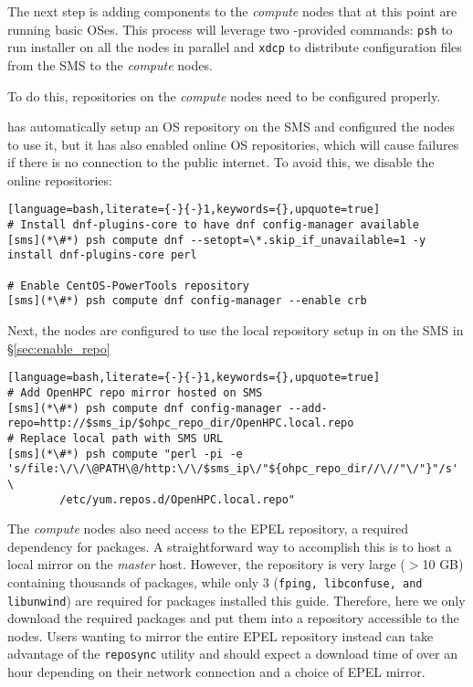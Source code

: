 
The next step is adding \OHPC{} components to the {\em compute} nodes that at this
point are running basic OSes.  This process will leverage two \xCAT{}-provided
commands: \texttt{psh} to run \texttt{\pkgmgr{}} installer on all the
nodes in parallel  and \texttt{xdcp} to distribute configuration files from the
SMS to the {\em compute} nodes. 

\noindent To do this, repositories on the {\em compute} nodes need to be configured
properly. 

\xCAT{} has automatically setup an  OS repository on the SMS and configured the
nodes to use it, but it has  also enabled online OS repositories, which will
cause  \texttt{\pkgmgr{}} failures if there is no connection to the public internet. 
To avoid this, we disable the online repositories:

\begin{lstlisting}[language=bash,literate={-}{-}1,keywords={},upquote=true]
# Install dnf-plugins-core to have dnf config-manager available
[sms](*\#*) psh compute dnf --setopt=\*.skip_if_unavailable=1 -y install dnf-plugins-core perl

# Enable CentOS-PowerTools repository
[sms](*\#*) psh compute dnf config-manager --enable crb
\end{lstlisting}

\noindent Next, the nodes are configured to use the local \OHPC{} repository
setup in on the SMS in \S\ref{sec:enable_repo}

\begin{lstlisting}[language=bash,literate={-}{-}1,keywords={},upquote=true]
# Add OpenHPC repo mirror hosted on SMS
[sms](*\#*) psh compute dnf config-manager --add-repo=http://$sms_ip/$ohpc_repo_dir/OpenHPC.local.repo
# Replace local path with SMS URL
[sms](*\#*) psh compute "perl -pi -e 's/file:\/\/\@PATH\@/http:\/\/$sms_ip\/"${ohpc_repo_dir//\//"\/"}"/s' \
        /etc/yum.repos.d/OpenHPC.local.repo"
\end{lstlisting}

The {\em compute} nodes also need access to the EPEL repository, a required
dependency for \OHPC{} packages. A straightforward way to accomplish this is to
host a local mirror on the {\em master} host. However, the repository is very
large ($>$10 GB) containing thousands of packages, while only 3 (\texttt{fping,
libconfuse, and libunwind}) are required for packages installed this guide.  Therefore,
here we only download the required packages and put them into a repository
accessible to the nodes.  Users wanting to mirror the entire EPEL repository
instead can take advantage of the \texttt{reposync} utility and should expect a
download time of over an hour depending on their network connection and a choice
of EPEL mirror.

